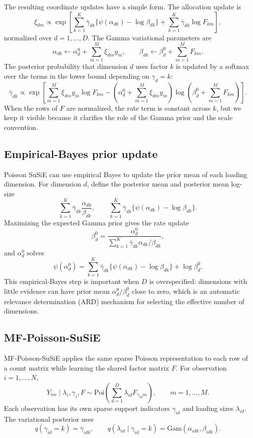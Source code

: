 \documentclass[11pt]{article}
\newcommand{\Poi}{\mathrm{Poi}}
\newcommand{\Gam}{\mathrm{Gam}}
\theoremstyle{definition}
\begin{document}
The resulting coordinate updates have a simple form. The allocation update is
\[
  \xi_{dm}
  \propto
  \exp\left[
    \sum_{k=1}^K \bar{\gamma}_{dk}
    \{\psi(\alpha_{dk})-\log\beta_{dk}\}
    +
    \sum_{k=1}^K \bar{\gamma}_{dk}\log F_{km}
  \right],
\]
normalized over $d=1,\ldots,D$. The Gamma variational parameters are
\[
  \alpha_{dk}
  \leftarrow
  \alpha_d^0+\sum_{m=1}^M \xi_{dm}y_m,
  \qquad
  \beta_{dk}
  \leftarrow
  \beta_d^0+\sum_{m=1}^M F_{km}.
\]
The posterior probability that dimension $d$ uses factor $k$ is updated by a
softmax over the terms in the lower bound depending on $\gamma_d=k$:
\[
  \bar{\gamma}_{dk}
  \propto
  \exp\left[
    \sum_{m=1}^M \xi_{dm}y_m \log F_{km}
    -
    \left(\alpha_d^0+\sum_{m=1}^M \xi_{dm}y_m\right)
    \log\left(\beta_d^0+\sum_{m=1}^M F_{km}\right)
  \right].
\]
When the rows of $F$ are normalized, the rate term is constant across $k$, but
we keep it visible because it clarifies the role of the Gamma prior and the
scale convention.

\subsection{Empirical-Bayes prior update}

Poisson SuSiE can use empirical Bayes to update the prior mean of each loading
dimension. For dimension $d$, define the posterior mean and posterior mean
log-size
\[
  \sum_{k=1}^K \bar{\gamma}_{dk}\frac{\alpha_{dk}}{\beta_{dk}},
  \qquad
  \sum_{k=1}^K
  \bar{\gamma}_{dk}\{\psi(\alpha_{dk})-\log\beta_{dk}\}.
\]
Maximizing the expected Gamma prior gives the rate update
\[
  \beta_d^0
  =
  \frac{\alpha_d^0}
       {\sum_{k=1}^K \bar{\gamma}_{dk}\alpha_{dk}/\beta_{dk}},
\]
and $\alpha_d^0$ solves
\[
  \psi(\alpha_d^0)
  =
  \sum_{k=1}^K
  \bar{\gamma}_{dk}\{\psi(\alpha_{dk})-\log\beta_{dk}\}
  + \log\beta_d^0.
\]
This empirical-Bayes step is important when $D$ is overspecified: dimensions with
little evidence can have prior mean $\alpha_d^0/\beta_d^0$ close to zero,
which is an automatic relevance determination (ARD) mechanism for selecting the
effective number of dimensions.

\subsection{MF-Poisson-SuSiE}

MF-Poisson-SuSiE applies the same sparse Poisson representation to each row of a
count matrix while learning the shared factor matrix $F$. For observation
$i=1,\ldots,N$,
\[
  Y_{im} \mid \lambda_i,\gamma_i,F
  \sim
  \Poi\left(
    \sum_{d=1}^D \lambda_{id}F_{\gamma_{id}m}
  \right),
  \qquad m=1,\ldots,M.
\]
Each observation has its own sparse support indicators $\gamma_{id}$ and loading
sizes $\lambda_{id}$. The variational posterior uses
\[
  q(\gamma_{id}=k)=\bar{\gamma}_{idk},
  \qquad
  q(\lambda_{id}\mid\gamma_{id}=k)
  =
  \Gam(\alpha_{idk},\beta_{idk}).
\]
\end{document}
